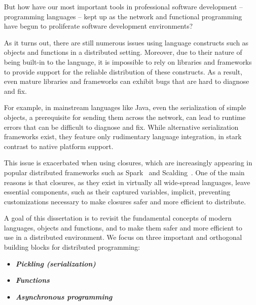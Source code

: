 
But how have our most important tools in professional software development --
programming languages -- kept up as the network and functional programming have
begun to proliferate software development environments?

As it turns out, there are still numerous issues using language constructs such
as objects and functions in a distributed setting. Moreover, due to their nature
of being built-in to the language, it is impossible to rely on libraries and
frameworks to provide support for the reliable distribution of these constructs.
As a result, even mature libraries and frameworks can exhibit bugs that are hard
to diagnose and fix.

For example, in mainstream languages like Java, even the serialization of simple
objects, a prerequisite for sending them across the network, can lead to runtime
errors that can be difficult to diagnose and fix. While alternative
serialization frameworks exist, they feature only rudimentary language
integration, in stark contrast to native platform support.

This issue is exacerbated when using closures, which are increasingly appearing
in popular distributed frameworks such as Spark~\cite{Spark} and
Scalding~\cite{Scalding}. One of the main reasons is that closures, as they
exist in virtually all wide-spread languages, leave essential components, such
as their captured variables, implicit, preventing customizations necessary to
make closures safer and more efficient to distribute.

A goal of this dissertation is to revisit the fundamental concepts of modern
languages, objects and functions, and to make them safer and more efficient to
use in a distributed environment. We focus on three important and orthogonal
building blocks for distributed programming:

\begin{itemize}
  \item {\bf \em Pickling (serialization)}
  \item {\bf \em Functions}
  \item {\bf \em Asynchronous programming}
\end{itemize}

